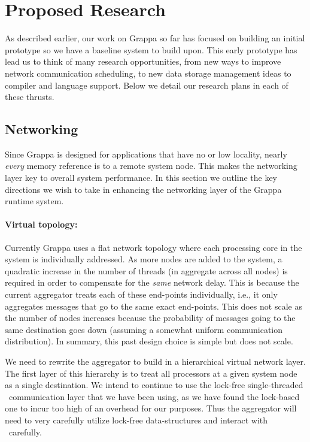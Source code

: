 \section{Proposed Research}

As described earlier, our work on Grappa so far has focused on building an initial prototype so we have a baseline system to build upon. This early prototype has lead us to think of many research opportunities, from new ways to improve network communication scheduling, to new data storage management ideas to compiler and language support. Below we detail our research plans in each of these thrusts. 

\subsection{Networking}

Since Grappa is designed for applications that have no or low locality, nearly \emph{every} memory reference is to a remote system node.  This makes the networking layer key to overall system performance.  In this section we outline the key directions we wish to take in enhancing the networking layer of the Grappa runtime system.

\paragraph{Virtual topology:} Currently Grappa uses a flat network topology where each processing core in the system is individually addressed. As more nodes are added to the system, a quadratic increase in the number of threads (in aggregate across all nodes) is required in order to compensate for the \emph{same} network delay.  This is because the current aggregator treats each of these end-points individually, i.e., it only aggregates messages that go to the same exact end-points. This does not scale as the number of nodes increases because the probability of messages going to the same destination goes down (assuming a somewhat uniform communication distribution). In summary, this past design choice is simple but does not scale.

We need to rewrite the aggregator to build in a hierarchical virtual network layer.  The first layer of this hierarchy is to treat all processors at a given system node as a single destination. We intend to continue to use the lock-free single-threaded \gasnet~communication layer that we have been using, as we have found the lock-based one to incur too high of an overhead for our purposes.  Thus the aggregator will need to very carefully utilize lock-free data-structures and interact with \gasnet~carefully.


